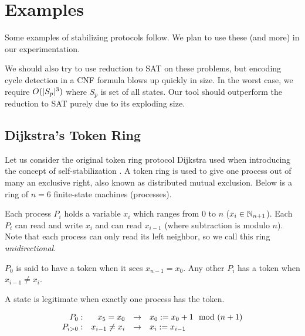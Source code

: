 \section{Examples}
Some examples of stabilizing protocols follow.
We plan to use these (and more) in our experimentation.

We should also try to use reduction to SAT on these problems, but encoding cycle detection in a CNF formula blows up quickly in size.
In the worst case, we require $O(\lvert S_p\rvert^3)$ where $S_p$ is set of all states.
Our tool should outperform the reduction to SAT purely due to its exploding size.

\subsection{Dijkstra's Token Ring}
Let us consider the original token ring protocol Dijkstra used when introducing the concept of self-stabilization \cite{dij}.
A token ring is used to give one process out of many an exclusive right, also known as distributed mutual exclusion.
Below is a ring of $n=6$ finite-state machines (processes).


Each process $P_i$ holds a variable $x_i$ which ranges from $0$ to $n$ ($x_i\in\mathbb{N}_{n+1}$).
Each $P_i$ can read and write $x_i$ and can read $x_{i-1}$ (where subtraction is modulo $n$).
Note that each process can only read its left neighbor, so we call this ring {\em unidirectional}.

$P_0$ is said to have a token when it sees $x_{n-1} = x_0$.
Any other $P_i$ has a token when $x_{i-1} \neq x_i$.

A state is legitimate when exactly one process has the token.

\[
\begin{array}{rrcl}
 P_0: & x_{5} = x_0 & \to & x_0 := x_0 + 1 \mod (n+1)
\\ P_{i>0}: & x_{i-1} \neq x_i & \to & x_i := x_{i-1}
\end{array}
\]

